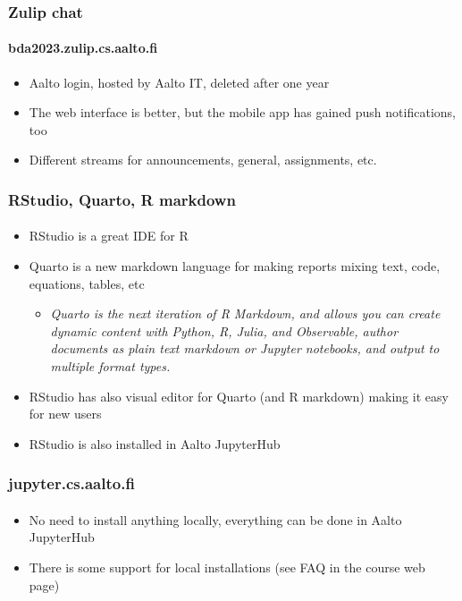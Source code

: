 \documentclass[english,t]{beamer}
\begin{document}
\begin{frame}

  \frametitle{Zulip chat}  %
  \framesubtitle{bda2023.zulip.cs.aalto.fi}

  \begin{itemize}
  \item Aalto login, hosted by Aalto IT, deleted after one year
  \item The web interface is better, but the mobile app has gained
    push notifications, too
  \item Different streams for announcements, general, assignments, etc.
  \end{itemize}
  
\end{frame}

\begin{frame}

  \frametitle{RStudio, Quarto, R markdown}  %
  \framesubtitle{}

  \begin{itemize}
  \item RStudio is a great IDE for R
  \item Quarto is a new markdown language for making reports mixing
    text, code, equations, tables, etc
    \begin{itemize}
    \item \textit{Quarto is the next iteration of R Markdown, and
        allows you can create dynamic content with Python, R, Julia,
        and Observable, author documents as plain text markdown or
        Jupyter notebooks, and output to multiple format types.}
    \end{itemize}
  \item RStudio has also visual editor for Quarto (and R markdown)
    making it easy for new users
  \item RStudio is also installed in Aalto JupyterHub
  \end{itemize}
  
\end{frame}  

\begin{frame}

  \frametitle{jupyter.cs.aalto.fi}  %
  \framesubtitle{}

  \begin{itemize}
  \item No need to install anything locally, everything can be done in
    Aalto JupyterHub
  \item There is some support for local installations (see FAQ in the
    course web page)
  \end{itemize}
  
\end{frame}  
\end{document}
